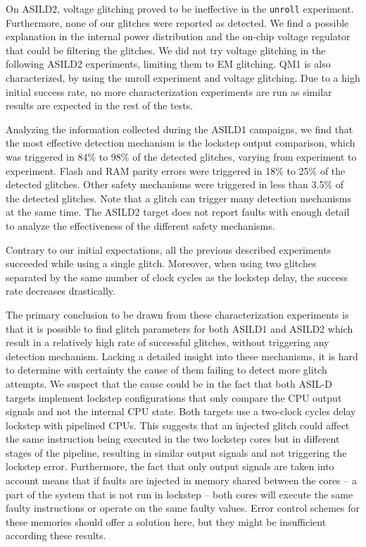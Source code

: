 \documentclass[10pt, conference, compsocconf]{IEEEtran}
\newcommand{\TI}{ASILD1\xspace}
\newcommand{\ST}{ASILD2\xspace}
\newcommand{\NXP}{QM1\xspace}
\newcommand{\unroll}{\texttt{unroll}\xspace}
\begin{document}
On \ST, voltage glitching proved to be ineffective in the \unroll experiment. Furthermore, none of our glitches were reported as detected. We find a possible explanation in the internal power distribution and the on-chip voltage regulator that could be filtering the glitches. We did not try voltage glitching in the following \ST experiments, limiting them to EM glitching. 
\NXP is also characterized, by using the unroll experiment and voltage glitching. Due to a high  initial success rate, no more characterization experiments are run as similar results are expected in the rest of the tests.

Analyzing the information collected during the \TI campaigns, we find that the most effective detection mechanism is the lockstep output comparison, which was triggered in 84\% to 98\% of the detected glitches, varying from experiment to experiment. Flash and RAM parity errors were triggered in 18\% to 25\% of the detected glitches. Other safety mechanisms were triggered in less than 3.5\% of the detected glitches. Note that a glitch can trigger many detection mechanisms at the same time. The \ST target does not report faults with enough detail to analyze the effectiveness of the different safety mechanisms.

Contrary to our initial expectations, all the previous described experiments succeeded while using a single glitch. Moreover, when using two glitches separated by the same number of clock cycles as the lockstep delay, the success rate decreases drastically.

The primary conclusion to be drawn from these characterization experiments is that it is possible to find glitch parameters for both \TI and \ST which result in a relatively high rate of successful glitches, without triggering any detection mechanism. 
Lacking a detailed insight into these mechanisms, it is hard to determine  with certainty the cause of them failing to detect more glitch attempts. 
We suspect that the cause could be in the fact that both ASIL-D targets implement lockstep configurations that only compare the CPU output signals and not the internal CPU state. Both targets use a two-clock cycles delay lockstep with pipelined CPUs. This suggests that an injected glitch could affect the same instruction being executed in the two lockstep cores but in different stages of the pipeline, resulting in similar output signals and not triggering the lockstep error. Furthermore, the fact that only output signals are taken into account means that if faults are injected in memory shared between the cores -- a part of the system that is not run in lockstep -- both cores will execute the same faulty instructions or operate on the same faulty values. Error control schemes for these memories should offer a solution here, but they might be insufficient according these results.
\end{document}
